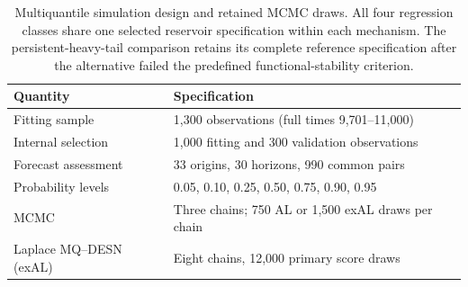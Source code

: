 \begin{table}[!htbp]
\centering
\footnotesize
\setlength{\tabcolsep}{3pt}
\renewcommand{\arraystretch}{1.08}
\begin{tabular}{@{}ll@{}}
\toprule
Quantity & Specification \\
\midrule
Fitting sample & 1,300 observations (full times 9,701--11,000) \\
Internal selection & 1,000 fitting and 300 validation observations \\
Forecast assessment & 33 origins, 30 horizons, 990 common pairs \\
Probability levels & 0.05, 0.10, 0.25, 0.50, 0.75, 0.90, 0.95 \\
MCMC & Three chains; 750 AL or 1,500 exAL draws per chain \\
Laplace MQ--DESN (exAL) & Eight chains, 12,000 primary score draws \\
\bottomrule
\end{tabular}
\caption{Multiquantile simulation design and retained MCMC draws. All four regression classes share one selected reservoir specification within each mechanism. The persistent-heavy-tail comparison retains its complete reference specification after the alternative failed the predefined functional-stability criterion.}
\label{tab:joint-qdesn-pure-desn-v2-protocol}
\end{table}
